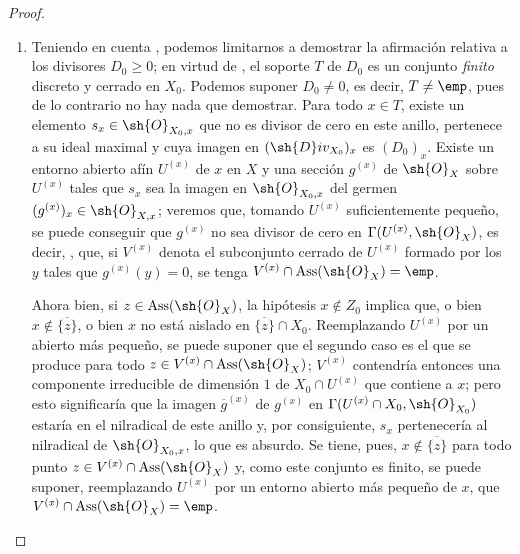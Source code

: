 \begin{proof}
\begin{enumerate}[label=(\roman*)]
  \item Teniendo en cuenta , podemos limitarnos a demostrar la afirmación relativa a los divisores $D_0\geq0$;
en virtud de , el soporte $T$ de $D_0$ es un conjunto \emph{finito} discreto y cerrado en $X_0$.
Podemos suponer $D_0\neq0$, es decir, $T\neq\emp$, pues de lo contrario no hay nada que demostrar.
Para todo $x\in T$, existe un elemento $s_x\in\sh{O}_{X_0,x}$ que no es divisor de cero en este anillo, pertenece a su ideal maximal y cuya imagen en $(\sh{D}iv_{X_0})_x$ es $(D_0)_x$.
Existe un entorno abierto afín $U^{(x)}$ de $x$ en $X$ y una sección $g^{(x)}$ de $\sh{O}_X$ sobre $U^{(x)}$ tales que $s_x$ sea la imagen en $\sh{O}_{X_0,x}$ del germen $(g^{(x)})_x\in\sh{O}_{X,x}$;
veremos que, tomando $U^{(x)}$ suficientemente pequeño, se puede conseguir que $g^{(x)}$ no sea divisor de cero en $\Gamma(U^{(x)},\sh{O}_X)$, es decir, , que, si $V^{(x)}$ denota el subconjunto cerrado de $U^{(x)}$ formado por los $y$ tales que $g^{(x)}(y)=0$, se tenga $V^{(x)}\cap\operatorname{Ass}(\sh{O}_X)=\emp$.

Ahora bien, si $z\in\operatorname{Ass}(\sh{O}_X)$, la hipótesis $x\notin Z_0$ implica que, o bien $x\notin\overline{\{z\}}$, o bien $x$ no está aislado en $\overline{\{z\}}\cap X_0$.
Reemplazando $U^{(x)}$ por un abierto más pequeño, se puede suponer que el segundo caso es el que se produce para todo $z\in V^{(x)}\cap\operatorname{Ass}(\sh{O}_X)$;
$V^{(x)}$ contendría entonces una componente irreducible de dimensión $1$ de $X_0\cap U^{(x)}$ que contiene a $x$;
pero esto significaría que la imagen $\overline{g}^{(x)}$ de $g^{(x)}$ en $\Gamma(U^{(x)}\cap X_0,\sh{O}_{X_0})$ estaría en el nilradical de este anillo y, por consiguiente, $s_x$ pertenecería al nilradical de $\sh{O}_{X_0,x}$, lo que es absurdo.
Se tiene, pues, $x\notin\overline{\{z\}}$ para todo punto $z\in V^{(x)}\cap\operatorname{Ass}(\sh{O}_X)$ y, como este conjunto es finito, se puede suponer, reemplazando $U^{(x)}$ por un entorno abierto más pequeño de $x$, que $V^{(x)}\cap\operatorname{Ass}(\sh{O}_X)=\emp$.


\end{enumerate}
\end{proof}
